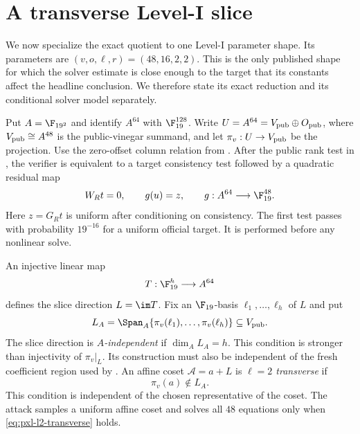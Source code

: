 
\section{A transverse Level-I slice}
\label{sec:pxl-level1-slice}

We now specialize the exact quotient to one Level-I parameter shape.  Its
parameters are $(v,o,\ell,r)=(48,16,2,2)$.  This is the only published shape
for which the solver estimate is close enough to the target that its constants
affect the headline conclusion.  We therefore state its exact reduction and
its conditional solver model separately.

Put $A=\F_{19^2}$ and identify $A^{64}$ with $\F_{19}^{128}$.  Write
$U=A^{64}=V_{\rm pub}\oplus O_{\rm pub}$, where
$V_{\rm pub}\cong A^{48}$ is the public-vinegar summand, and let
$\pi_v:U\to V_{\rm pub}$ be the projection.  Use the
zero-offset column relation from .  After the public rank
test in , the verifier is equivalent to a target
consistency test followed by a quadratic residual map
\begin{equation}
 W_Rt=0,
 \qquad
 g(u)=z,
 \qquad
 g:A^{64}\longrightarrow\F_{19}^{48}.
 \label{eq:pxl-level1-residual}
\end{equation}
Here $z=G_Rt$ is uniform after conditioning on consistency.  The first test
passes with probability $19^{-16}$ for a uniform official target.  It is
performed before any nonlinear solve.

An injective linear map
\[
 T:\F_{19}^{h}\longrightarrow A^{64}
\]
defines the slice direction $L=\im T$.  Fix an $\F_{19}$-basis
$\ell_1,\ldots,\ell_h$ of $L$ and put
\begin{equation}
 L_A=\Span_A\{\pi_v(\ell_1),\ldots,\pi_v(\ell_h)\}
 \subseteq V_{\rm pub}.
 \label{eq:pxl-extension-span}
\end{equation}
The slice direction is \emph{$A$-independent} if
$\dim_A L_A=h$.  This condition is stronger than injectivity of
$\pi_v|_L$.  Its construction must also be independent of the fresh
coefficient region used by .  An affine
coset $\mathcal A=a+L$ is \emph{$\ell=2$ transverse} if
\begin{equation}
 \pi_v(a)\notin L_A.
 \label{eq:pxl-l2-transverse}
\end{equation}
This condition is independent of the chosen representative of the coset.
The attack samples a uniform affine coset and solves all $48$ equations only
when \eqref{eq:pxl-l2-transverse} holds.

